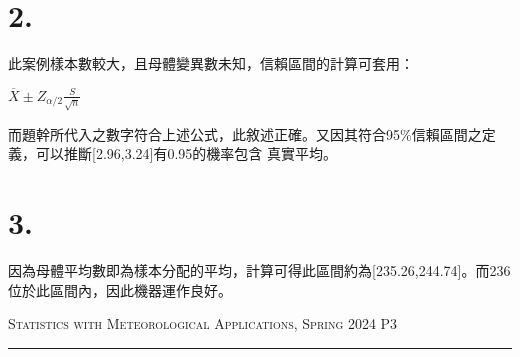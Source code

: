 \documentclass{article}
\begin{document}
\begin{CJK*}{UTF8}{bsmi}
\section*{2.}
\begin{spacing}{2}
    \begin{large}
        此案例樣本數較大，且母體變異數未知，信賴區間的計算可套用：\\
        \begin{center}
            $\overline{X}\pm Z_{\alpha/2} \frac{S}{\sqrt{n}}$
        \end{center}
        而題幹所代入之數字符合上述公式，此敘述正確。又因其符合95\%信賴區間之定義，可以推斷[2.96,3.24]有0.95的機率包含
        真實平均。
    \end{large}
\end{spacing}

\section*{3.}
\begin{spacing}{2}
    \begin{large}
        因為母體平均數即為樣本分配的平均，計算可得此區間約為[235.26,244.74]。而236位於此區間內，因此機器運作良好。
    \end{large}
\end{spacing}

        
\newpage
\thispagestyle{empty}
\hfill {\scshape \large Statistics with Meteorological Applications, Spring 2024} \hfill {\scshape P3}
\smallskip
\hrule    


\end{CJK*}
\end{document}
